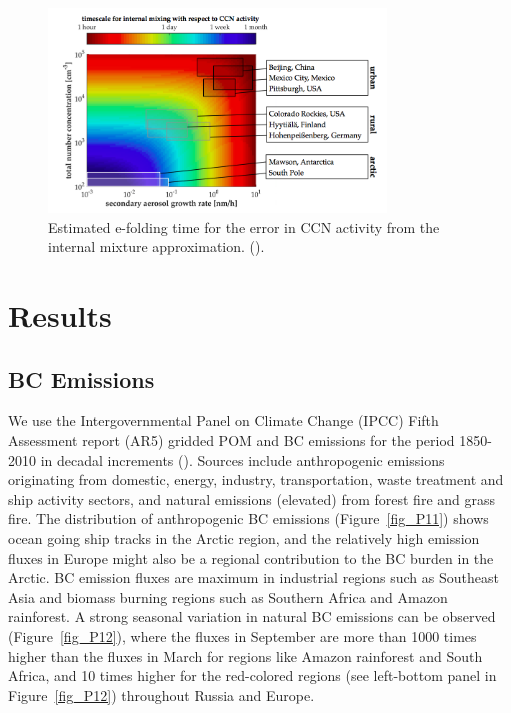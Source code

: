 \documentclass[12pt, fullpage]{uiucthesis2009}
\begin{document}
	\begin{figure}[h] 
		\begin{center}
			\includegraphics[width = 0.8\textwidth]{Figure07}
			\caption[Estimated e-folding time for the error in CCN activity from the internal mixture approximation. (\cite{Fierce2016})]{\label{fig_P7}Estimated e-folding time for the error in CCN activity from the internal mixture approximation. (\cite{Fierce2016}).}
		\end{center}
	\end{figure}
	
	\clearpage
	
	\chapter{Results}
	\section{BC Emissions}
	We use the Intergovernmental Panel on Climate Change (IPCC) Fifth Assessment report (AR5) gridded POM and BC emissions for the period 1850-2010 in decadal increments (\cite{Lamarque2010}). Sources include anthropogenic emissions originating from domestic, energy, industry, transportation, waste treatment and ship activity sectors, and natural emissions (elevated) from forest fire and grass fire. The distribution of anthropogenic BC emissions (Figure~\ref{fig_P11}) shows ocean going ship tracks in the Arctic region, and the relatively high emission fluxes in Europe might also be a regional contribution to the BC burden in the Arctic. BC emission fluxes are maximum in industrial regions such as Southeast Asia and biomass burning regions such as Southern Africa and Amazon rainforest. A strong seasonal variation in natural BC emissions can be observed (Figure~\ref{fig_P12}), where the fluxes in September are more than 1000 times higher than the fluxes in March for regions like Amazon rainforest and South Africa, and 10 times higher for the red-colored regions (see left-bottom panel in Figure~\ref{fig_P12}) throughout Russia and Europe. 
	
\end{document}
